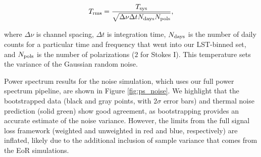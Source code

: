\documentclass[preprint2,numberedappendix,tighten]{aastex6}  %
\begin{document}
\begin{equation}
\label{eq:noise}
T_{\rm rms} = \frac{T_{\rm sys}}{\sqrt{\Delta\nu \Delta t N_{\rm days} N_{\rm pols}}},
\end{equation}

\noindent where $\Delta\nu$ is channel spacing, $\Delta t$ is integration time, $N_{\rm days}$ is the number of daily counts for a 
particular time and frequency that went into our LST-binned set, and $N_{\rm pols}$ is the number of polarizations ($2$ for Stokes 
I). This temperature sets the variance of the Gaussian random noise.

Power spectrum results for the noise simulation, which uses our full power spectrum pipeline, are shown in Figure 
\ref{fig:ps_noise}. We highlight that the bootstrapped data (black and gray points, with $2\sigma$ error bars) and thermal noise prediction (solid green) show good agreement, as bootstrapping provides an accurate estimate of the noise variance. However, the limits from the full signal loss framework (weighted and unweighted in red and blue, respectively) are inflated, likely due to the additional inclusion of sample variance that comes from the EoR simulations.
\end{document}
